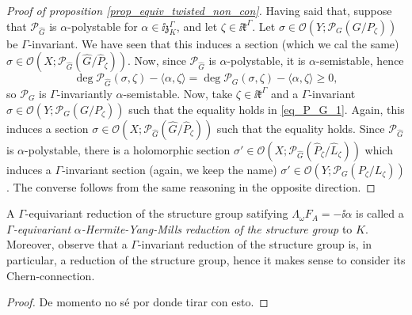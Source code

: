 {\begin{proof}[\textit{Proof of proposition} \ref{prop_equiv_twisted_non_con}]
    Having said that, suppose that \(\mathcal{P}_{\hat{G}}\) is \(\alpha\)-polystable for \(\alpha \in \ii \mathfrak{z}_K^\Gamma\), and let \(\zeta \in \ii \mathfrak{k}^\Gamma\). Let \(\sigma \in \mathcal{O}(Y; \mathcal{P}_{{G}}(G/P_\zeta))\) be \(\Gamma\)-invariant. We have seen that this induces a section (which we cal the same) \(\sigma \in \mathcal{O}(X; \mathcal{P}_{\hat{G}}(\hat{G}/\hat{P}_\zeta))\). Now, since \(\mathcal{P}_{\hat{G}}\) is \(\alpha\)-polystable, it is \(\alpha\)-semistable, hence 
    \begin{equation} \label{eq_P_G_1}
    \deg \mathcal{P}_{\hat{G}}(\sigma, \zeta)-\langle \alpha, \zeta\rangle=\deg \mathcal{P}_{{G}}(\sigma, \zeta)-\langle \alpha, \zeta \rangle \geq 0,
    \end{equation}
    so \(\mathcal{P}_{G}\) is \(\Gamma\)-invariantly \(\alpha\)-semistable. Now, take \(\zeta \in \ii \mathfrak{k}^\Gamma\) and a \(\Gamma\)-invariant \(\sigma \in \mathcal{O}(Y; \mathcal{P}_G(G/P_\zeta))\) such that the equality holds in \eqref{eq_P_G_1}. Again, this induces a section \(\sigma\in \mathcal{O}(X; \mathcal{P}_{\hat{G}}(\hat{G}/\hat{P}_\zeta))\) such that the equality holds. Since \(\mathcal{P}_{\hat{G}}\) is \(\alpha\)-polystable, there is a holomorphic section \(\sigma'\in \mathcal{O}(X; \mathcal{P}_{\hat{G}}(\hat{P}_\zeta/\hat{L}_\zeta))\) which induces a \(\Gamma\)-invariant section (again, we keep the name) \(\sigma'\in \mathcal{O}(Y; \mathcal{P}_G(P_\zeta/L_\zeta))\). The converse follows from the same reasoning in the opposite direction.
\end{proof}

A \(\Gamma\)-equivariant reduction of the structure group satifying \(\Lambda_\omega F_A=-\ii \alpha\) is called a \(\Gamma\)\textit{-equivariant} \(\alpha\)\textit{-Hermite-Yang-Mills reduction of the structure group} to \(K\). Moreover, observe that a \(\Gamma\)-invariant reduction of the structure group is, in particular, a reduction of the structure group, hence it makes sense to consider its Chern-connection.
\begin{proof}
    {\color{red}De momento no sé por donde tirar con esto.}
\end{proof}

}
